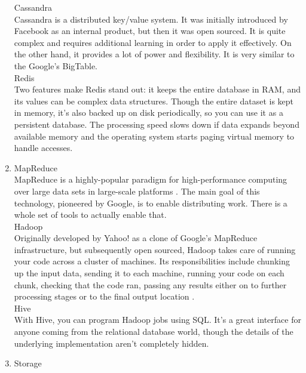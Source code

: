 \documentclass[runningheads]{llncs}
\begin{document}
\begin{enumerate}
Cassandra\\

Cassandra is a distributed key/value system. It was initially introduced by Facebook as an internal product, but then it was open sourced. It is quite complex and requires additional learning in order to apply it effectively. On the other hand, it provides a lot of power and flexibility. It is very similar to the Google's BigTable.\\

Redis\\ 

Two features make Redis stand out: it keeps the entire database in RAM, and its values can be complex data structures. Though the entire dataset is kept in memory, it's also backed up on disk periodically, so you can use it as a persistent database. The processing speed slows down if data expands beyond available memory and the operating system starts paging virtual memory to handle accesses.\\

\item MapReduce\\

MapReduce is a highly-popular paradigm for high-performance computing over large data sets in large-scale platforms \cite{MAPREDUCE}. The main goal of this technology, pioneered by Google, is to enable distributing work. There is a whole set of tools to actually enable that.\\ 

Hadoop\\

Originally developed by Yahoo! as a clone of Google's MapReduce infrastructure, but subsequently open sourced, Hadoop takes care of running your code across a cluster of machines. Its responsibilities include chunking up the input data, sending it to each machine, running your code on each chunk, checking that the code ran, passing any
results either on to further processing stages or to the final output location \cite{GLOSSARY}.\\

Hive\\

With Hive, you can program Hadoop jobs using SQL. It's a great interface for anyone coming from the relational database world, though the details of the underlying implementation aren't completely hidden.\\

\item Storage\\


\end{enumerate}
\end{document}
